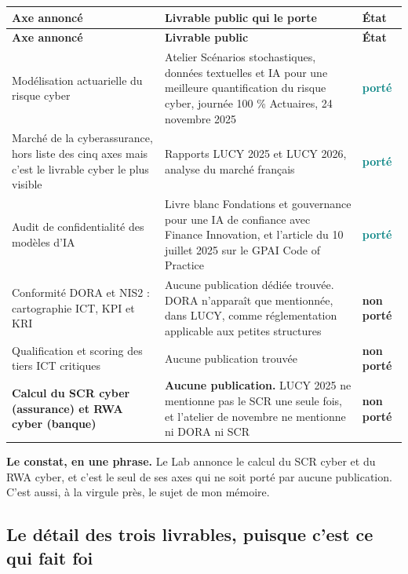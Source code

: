 \documentclass[11pt,a4paper]{article}
\newcommand{\etat}[2]{\textcolor{#1}{\textbf{\footnotesize #2}}}
\newcommand{\encadre}[2]{%
  \vspace{3pt}\noindent\colorbox{grisclair}{%
  \begin{minipage}{\dimexpr\textwidth-2\fboxsep}
  \small\textbf{#1} #2
  \end{minipage}}\vspace{4pt}}
\begin{document}
\begin{small}
\begin{longtable}{@{}L{5.2cm} L{8.6cm} l@{}}
\toprule
\textbf{Axe annoncé} & \textbf{Livrable public qui le porte} & \textbf{État} \\
\midrule
\endfirsthead
\toprule
\textbf{Axe annoncé} & \textbf{Livrable public} & \textbf{État} \\
\midrule
\endhead
\bottomrule
\endfoot
Modélisation actuarielle du risque cyber
& Atelier \og{}Scénarios stochastiques, données textuelles et IA pour une meilleure
  quantification du risque cyber\fg{}, journée 100 \% Actuaires, 24 novembre 2025
& \etat{teal}{porté} \\
\addlinespace
Marché de la cyberassurance, hors liste des cinq axes mais c'est le livrable cyber le plus
  visible
& Rapports LUCY 2025 et LUCY 2026, analyse du marché français
& \etat{teal}{porté} \\
\addlinespace
Audit de confidentialité des modèles d'IA
& Livre blanc \og{}Fondations et gouvernance pour une IA de confiance\fg{} avec Finance
  Innovation, et l'article du 10 juillet 2025 sur le GPAI Code of Practice
& \etat{teal}{porté} \\
\addlinespace
Conformité DORA et NIS2 : cartographie ICT, KPI et KRI
& Aucune publication dédiée trouvée. DORA n'apparaît que mentionnée, dans LUCY, comme
  réglementation applicable aux petites structures
& \etat{accent}{non porté} \\
\addlinespace
Qualification et scoring des tiers ICT critiques
& Aucune publication trouvée
& \etat{accent}{non porté} \\
\addlinespace
\textbf{Calcul du SCR cyber (assurance) et RWA cyber (banque)}
& \textbf{Aucune publication.} LUCY 2025 ne mentionne pas le SCR une seule fois, et l'atelier
  de novembre ne mentionne ni DORA ni SCR
& \etat{accent}{non porté} \\
\end{longtable}
\end{small}

\encadre{Le constat, en une phrase.}{Le Lab annonce le calcul du SCR cyber et du RWA cyber, et
c'est le seul de ses axes qui ne soit porté par aucune publication. C'est aussi, à la virgule
près, le sujet de mon mémoire.}

\subsection{Le détail des trois livrables, puisque c'est ce qui fait foi}
\end{document}
